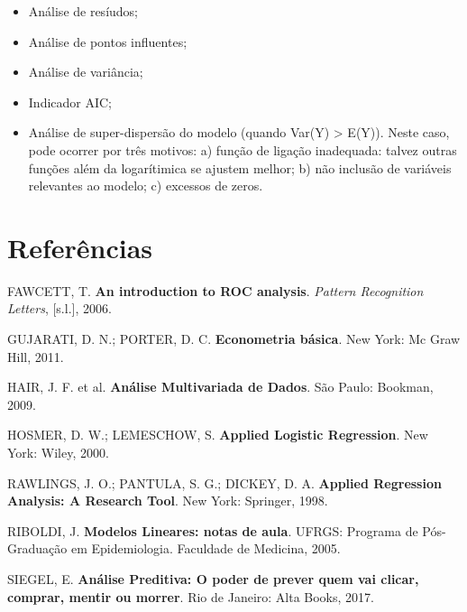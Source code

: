 \documentclass[12pt,brazil,oneside]{book}
\providecommand{\tightlist}{%
  \setlength{\itemsep}{0pt}\setlength{\parskip}{0pt}}
\begin{document}
\begin{itemize}
\tightlist
\item
  Análise de resíudos;
\item
  Análise de pontos influentes;
\item
  Análise de variância;
\item
  Indicador AIC;
\item
  Análise de super-dispersão do modelo (quando Var(Y) \textgreater{}
  E(Y)). Neste caso, pode ocorrer por três motivos: a) função de ligação
  inadequada: talvez outras funções além da logarítimica se ajustem
  melhor; b) não inclusão de variáveis relevantes ao modelo; c) excessos
  de zeros.
\end{itemize}

\hypertarget{referencias}{%
\chapter*{Referências}\label{referencias}}

\hypertarget{refs}{}
\leavevmode\hypertarget{ref-Fawcett2006}{}%
FAWCETT, T. \textbf{An introduction to ROC analysis}. \emph{Pattern
Recognition Letters}, {[}s.l.{]}, 2006.

\leavevmode\hypertarget{ref-Gujarati2011}{}%
GUJARATI, D. N.; PORTER, D. C. \textbf{Econometria básica}. New York: Mc
Graw Hill, 2011.

\leavevmode\hypertarget{ref-Hair2009}{}%
HAIR, J. F. et al. \textbf{Análise Multivariada de Dados}. São Paulo:
Bookman, 2009.

\leavevmode\hypertarget{ref-Hosmer2000}{}%
HOSMER, D. W.; LEMESCHOW, S. \textbf{Applied Logistic Regression}. New
York: Wiley, 2000.

\leavevmode\hypertarget{ref-penn2018}{}%

\leavevmode\hypertarget{ref-Rawlings1998}{}%
RAWLINGS, J. O.; PANTULA, S. G.; DICKEY, D. A. \textbf{Applied
Regression Analysis: A Research Tool}. New York: Springer, 1998.

\leavevmode\hypertarget{ref-Riboldi2005}{}%
RIBOLDI, J. \textbf{Modelos Lineares: notas de aula}. UFRGS: Programa de
Pós-Graduação em Epidemiologia. Faculdade de Medicina, 2005.

\leavevmode\hypertarget{ref-Siegel2017}{}%
SIEGEL, E. \textbf{Análise Preditiva: O poder de prever quem vai clicar,
comprar, mentir ou morrer}. Rio de Janeiro: Alta Books, 2017.

\leavevmode\hypertarget{ref-Torres-Reyna2014}{}%
\end{document}

